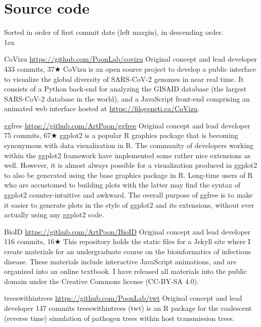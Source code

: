 \section{Source code}

Sorted in order of first commit date (left margin), in descending order.\\

\parskip 1ex

{CoVizu}
{\url{https://github.com/PoonLab/covizu}}
{Original concept and lead developer}
{433 commits, 37$\bigstar$}
{CoVizu is an open source project to develop a public interface to visualize the global diversity of SARS-CoV-2 genomes in near real time.
It consists of a Python back-end for analyzing the GISAID database (the largest SARS-CoV-2 database in the world), and a JavaScript front-end comprising an animated web interface hosted at \url{https://filogeneti.ca/CoVizu}.}


{ggfree}
{\url{https://github.com/ArtPoon/ggfree}}
{Original concept and lead developer}
{75 commits, 67$\bigstar$}
{ggplot2 is a popular R graphics package that is becoming synonymous with data visualization in R. The community of developers working within the ggplot2 framework have implemented some rather nice extensions as well. However, it is almost always possible for a visualization produced in ggplot2 to also be generated using the base graphics package in R. Long-time users of R who are accustomed to building plots with the latter may find the syntax of ggplot2 counter-intuitive and awkward. The overall purpose of ggfree is to make it easier to generate plots in the style of ggplot2 and its extensions, without ever actually using any ggplot2 code.}

{BioID}
{\url{https://github.com/ArtPoon/BioID}}
{Original concept and lead developer}
{116 commits, 16$\bigstar$}
{This repository holds the static files for a Jekyll site where I create materials for an undergraduate course on the bioinformatics of infectious disease.  These materials include interactive JavaScript animations, and are organized into an online textbook.  I have released all materials into the public domain under the Creative Commons license (CC-BY-SA 4.0).}



{treeswithintrees}
{\url{https://github.com/PoonLab/twt}}
{Original concept and lead developer}
{147 commits}
{treeswithintrees (twt) is an R package for the coalescent (reverse time) simulation of pathogen trees within host transmission trees.}


